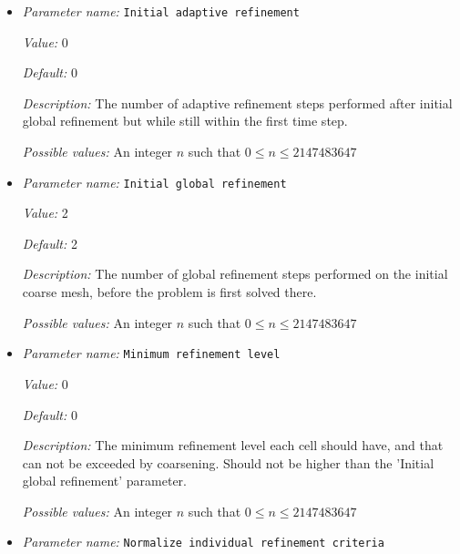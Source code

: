 \begin{itemize}
{\it Description:} The fraction of cells with the smallest error that should be flagged for coarsening.


{\it Possible values:} A floating point number $v$ such that $0 \leq v \leq 1$
\item {\it Parameter name:} {\tt Initial adaptive refinement}
\label{parameters:Mesh refinement/Initial adaptive refinement}


{\it Value:} 0


{\it Default:} 0


{\it Description:} The number of adaptive refinement steps performed after initial global refinement but while still within the first time step.


{\it Possible values:} An integer $n$ such that $0\leq n \leq 2147483647$
\item {\it Parameter name:} {\tt Initial global refinement}
\label{parameters:Mesh refinement/Initial global refinement}


{\it Value:} 2


{\it Default:} 2


{\it Description:} The number of global refinement steps performed on the initial coarse mesh, before the problem is first solved there.


{\it Possible values:} An integer $n$ such that $0\leq n \leq 2147483647$
\item {\it Parameter name:} {\tt Minimum refinement level}
\label{parameters:Mesh refinement/Minimum refinement level}


{\it Value:} 0


{\it Default:} 0


{\it Description:} The minimum refinement level each cell should have, and that can not be exceeded by coarsening. Should not be higher than the 'Initial global refinement' parameter.


{\it Possible values:} An integer $n$ such that $0\leq n \leq 2147483647$
\item {\it Parameter name:} {\tt Normalize individual refinement criteria}
\label{parameters:Mesh refinement/Normalize individual refinement criteria}



\end{itemize}
